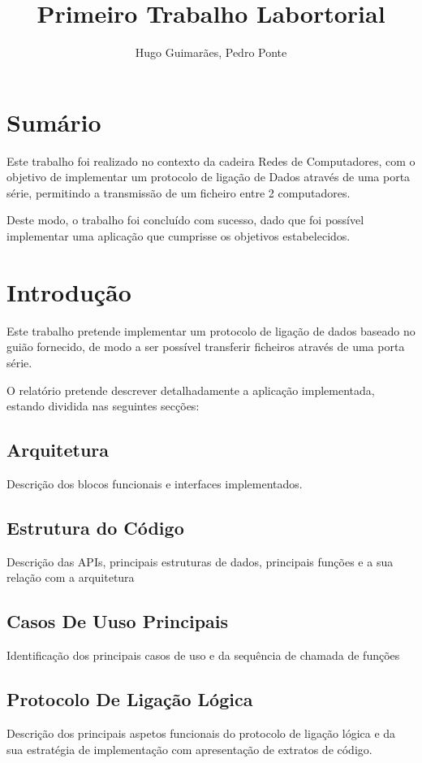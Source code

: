 \documentclass{article}
\author{Hugo Guimarães, Pedro Ponte}
\title{Primeiro Trabalho Labortorial}
\begin{document}
\maketitle 

\pagebreak
\section{Sumário}

Este trabalho foi realizado no contexto da cadeira Redes de Computadores, com o objetivo de implementar um protocolo de  ligação de Dados através de uma porta série, permitindo a transmissão de um ficheiro entre 2 computadores.
 
Deste modo, o trabalho foi concluído com sucesso, dado que foi possível implementar uma aplicação que cumprisse os objetivos estabelecidos.


\section{Introdução}

Este trabalho pretende implementar um protocolo de ligação de dados baseado no guião fornecido, de modo a ser possível transferir ficheiros através de uma porta série.

O relatório pretende descrever detalhadamente a aplicação implementada, estando dividida nas seguintes secções:

\subsection{Arquitetura}
Descrição dos blocos funcionais e interfaces implementados.


\subsection{Estrutura do Código}
Descrição das APIs, principais estruturas de dados, principais funções e a sua relação com a arquitetura

\subsection{Casos De Uuso Principais}
Identificação dos principais casos de uso e da sequência de chamada de funções

\subsection{Protocolo De Ligação Lógica}
Descrição dos principais aspetos funcionais do protocolo de ligação lógica e da sua estratégia de implementação com apresentação de extratos de código.
\end{document}
